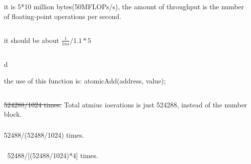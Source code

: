 \documentclass{article}
\begin{document}
\subsection{}
it is 5*10 million bytes(50MFLOPs/s), the amount of throughput is the number of floating-point operations per second.

\subsection{}
it should be about \(\frac{1}{1ns}/1.1*5\)

\subsection{}
d

the use of this function is: atomicAdd(address, value);

\subsection{}
\subsubsection{}
\sout{524288/1024 times.} Total atmiuc ioerations is just 524288, instead of the number block.

\subsubsection{}
52488/(52488/1024) times.

\subsubsection{}\
52488/[(52488/1024)*4] times.
\end{document}
